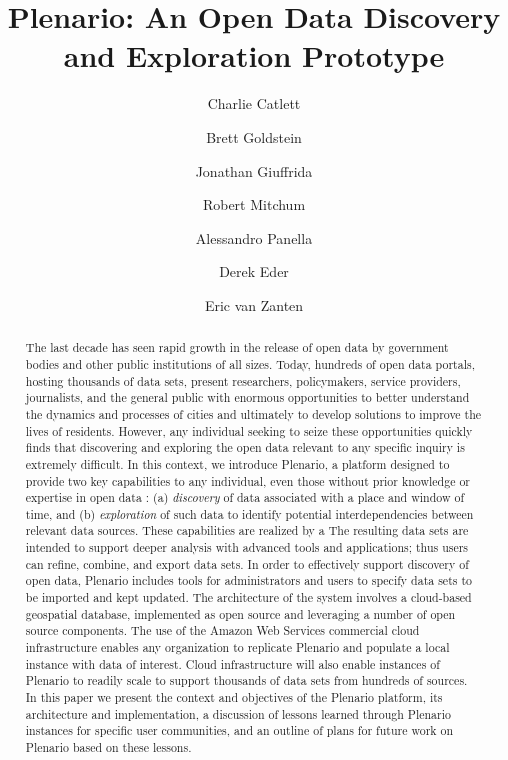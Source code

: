 \documentclass[11pt]{article}
\title{Plenario: An Open Data Discovery and Exploration Prototype}
\author[1,2]{Charlie Catlett}
\author[2,1]{Brett Goldstein}
\author[2]{Jonathan Giuffrida}
\author[1]{Robert Mitchum}
\author[1]{Alessandro Panella}
\author[3]{Derek Eder}
\author[3]{Eric van Zanten}
\affil[1]{Urban Center for Computation and Data, Computation Institute of the University of Chicago and Argonne National Laboratory}
\affil[2]{Harris School of Public Policy, University of Chicago}
\affil[3]{DataMade, LLC}
\begin{document}
\maketitle

\begin{abstract}
The last decade has seen rapid growth in the release of open data by government bodies and other public institutions of all sizes. Today, hundreds of open data portals, hosting thousands of data sets, present researchers, policymakers, service providers, journalists, and the general public with enormous opportunities to better understand the dynamics and processes of cities and ultimately to develop solutions to improve the lives of residents. However, any individual seeking to seize these opportunities quickly finds that discovering and exploring the open data relevant to any specific inquiry is extremely difficult. In this context, we introduce Plenario, a platform designed to provide two key capabilities to any individual, even those without prior knowledge or expertise in open data : (a) \emph{discovery} of data associated with a place and window of time, and (b) \emph{exploration} of such data to identify potential interdependencies between relevant data sources. These capabilities are realized by a 
The resulting data sets are intended to support deeper analysis with advanced tools and applications; thus users can refine, combine, and export data sets. In order to effectively support discovery of open data, Plenario includes tools for administrators and users to specify data sets to be imported and kept updated. The architecture of the system involves a cloud-based geospatial database, implemented as open source and leveraging a number of open source components. The use of the Amazon Web Services commercial cloud infrastructure enables any organization to replicate Plenario and populate a local instance with data of interest. Cloud infrastructure will also enable instances of Plenario to readily scale to support thousands of data sets from hundreds of sources. In this paper we present the context and objectives of the Plenario platform, its architecture and implementation, a discussion of lessons learned through Plenario instances for specific user communities, and an outline of plans for future work on Plenario based on these lessons.
\end{abstract}

\newpage
\end{document}
